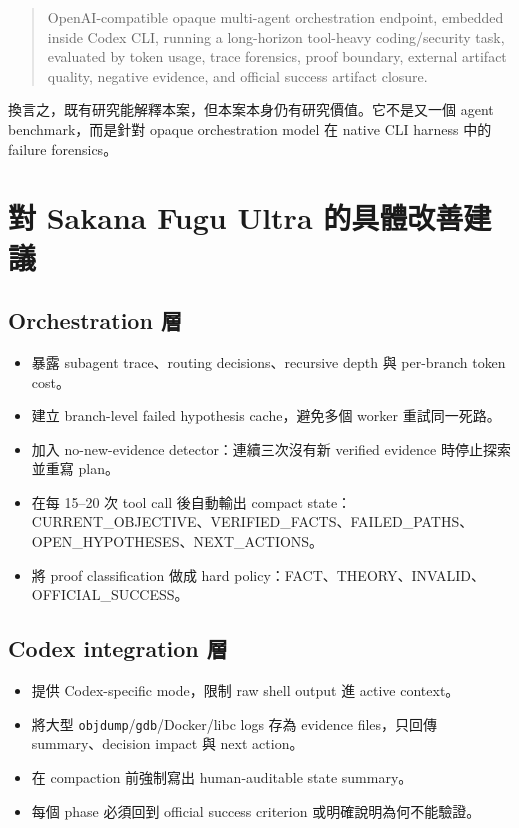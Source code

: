 \documentclass[UTF8,a4paper,11pt]{ctexart}
\newcommand{\code}[1]{\texttt{#1}}
\begin{document}
\begin{quote}
OpenAI-compatible opaque multi-agent orchestration endpoint, embedded inside Codex CLI, running a long-horizon tool-heavy coding/security task, evaluated by token usage, trace forensics, proof boundary, external artifact quality, negative evidence, and official success artifact closure.
\end{quote}

換言之，既有研究能解釋本案，但本案本身仍有研究價值。它不是又一個 agent benchmark，而是針對 opaque orchestration model 在 native CLI harness 中的 failure forensics。

\section{對 Sakana Fugu Ultra 的具體改善建議}

\subsection{Orchestration 層}

\begin{itemize}
  \item 暴露 subagent trace、routing decisions、recursive depth 與 per-branch token cost。
  \item 建立 branch-level failed hypothesis cache，避免多個 worker 重試同一死路。
  \item 加入 no-new-evidence detector：連續三次沒有新 verified evidence 時停止探索並重寫 plan。
  \item 在每 15--20 次 tool call 後自動輸出 compact state：CURRENT\_OBJECTIVE、VERIFIED\_FACTS、FAILED\_PATHS、OPEN\_HYPOTHESES、NEXT\_ACTIONS。
  \item 將 proof classification 做成 hard policy：FACT、THEORY、INVALID、OFFICIAL\_SUCCESS。
\end{itemize}

\subsection{Codex integration 層}

\begin{itemize}
  \item 提供 Codex-specific mode，限制 raw shell output 進 active context。
  \item 將大型 \code{objdump}/\code{gdb}/Docker/libc logs 存為 evidence files，只回傳 summary、decision impact 與 next action。
  \item 在 compaction 前強制寫出 human-auditable state summary。
  \item 每個 phase 必須回到 official success criterion 或明確說明為何不能驗證。
\end{itemize}
\end{document}
